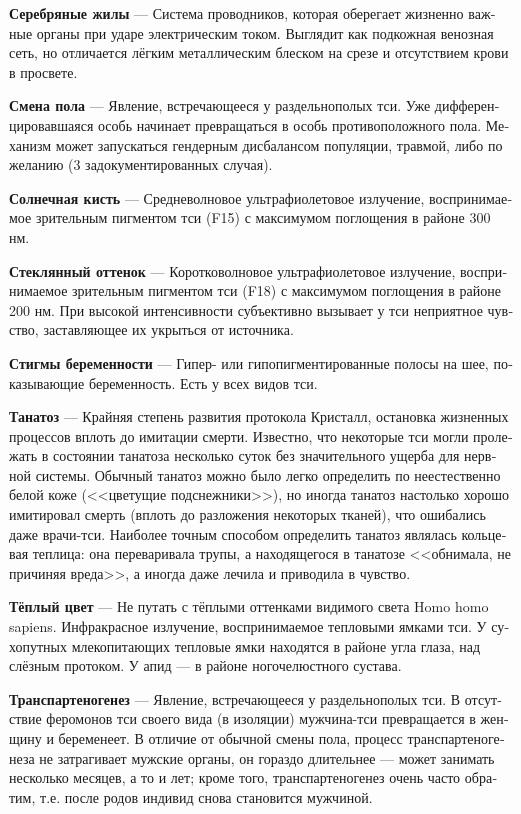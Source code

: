 \documentclass[a4paper,12pt,fleqn]{book}\usepackage{cooltooltips}\usepackage{polyglossia}\setdefaultlanguage[babelshorthands=true]{russian}\setotherlanguage{english}\defaultfontfeatures{Ligatures=TeX,Mapping=tex-text} \usepackage{xcolor}\definecolor{lightgray}{HTML}{bbbbbb}\color{lightgray}\newcommand{\ml}[3]{\textenglish{\textcolor{black}{#3}}}
\newcommand{\theterm}[3]{\textbf{\hypertarget{#1}{#2}} --- #3}
\begin{document}
\theterm{silver-veins}
{Серебряные жилы}
{Система проводников, которая оберегает жизненно важные органы при ударе электрическим током.
Выглядит как подкожная венозная сеть, но отличается лёгким металлическим блеском на срезе и отсутствием крови в просвете.}

\theterm{gender-switch}
{Смена пола}
{Явление, встречающееся у раздельнополых тси.
Уже дифференцировавшаяся особь начинает превращаться в особь противоположного пола.
Механизм может запускаться гендерным дисбалансом популяции, травмой, либо по желанию (3 задокументированных случая).}

\theterm{sun-touch}
{Солнечная кисть}
{Средневолновое ультрафиолетовое излучение, воспринимаемое зрительным пигментом тси (F15) с максимумом поглощения в районе 300 нм.}

\theterm{glass-hue}
{Стеклянный оттенок}
{Коротковолновое ультрафиолетовое излучение, воспринимаемое зрительным пигментом тси (F18) с максимумом поглощения в районе 200 нм.
При высокой интенсивности субъективно вызывает у тси неприятное чувство, заставляющее их укрыться от источника.}

\theterm{stigmae-of-pregnancy}
{Стигмы беременности}
{Гипер- или гипопигментированные полосы на шее, показывающие беременность.
Есть у всех видов тси.}

\theterm{tanatosis}
{Танатоз}
{Крайняя степень развития протокола Кристалл, остановка жизненных процессов вплоть до имитации смерти.
Известно, что некоторые тси могли пролежать в состоянии танатоза несколько суток без значительного ущерба для нервной системы.
Обычный танатоз можно было легко определить по неестественно белой коже (<<цветущие подснежники>>), но иногда танатоз настолько хорошо имитировал смерть (вплоть до разложения некоторых тканей), что ошибались даже врачи-тси.
Наиболее точным способом определить танатоз являлась кольцевая теплица: она переваривала трупы, а находящегося в танатозе <<обнимала, не причиняя вреда>>, а иногда даже лечила и приводила в чувство.}

\theterm{warm-color}
{Тёплый цвет}
{Не путать с тёплыми оттенками видимого света Homo homo sapiens.
Инфракрасное излучение, воспринимаемое тепловыми ямками тси.
У сухопутных млекопитающих тепловые ямки находятся в районе угла глаза, над слёзным протоком.
У апид --- в районе ногочелюстного сустава.}

\theterm{transpartenogenesis}
{Транспартеногенез}
{Явление, встречающееся у раздельнополых тси.
В отсутствие феромонов тси своего вида (в изоляции) мужчина-тси превращается в женщину и беременеет.
В отличие от обычной смены пола, процесс транспартеногенеза не затрагивает мужские органы, он гораздо длительнее --- может занимать несколько месяцев, а то и лет;
кроме того, транспартеногенез очень часто обратим, т.е. после родов индивид снова становится мужчиной.}
\end{document}

